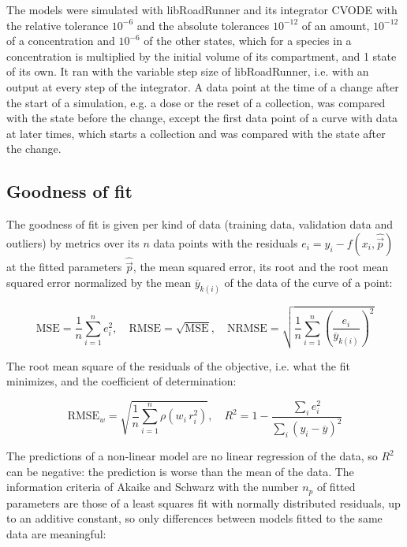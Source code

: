 The models were simulated with libRoadRunner \cite{Welsh2023} and its integrator CVODE \cite{Hindmarsh2005} with the relative tolerance $10^{-6}$ and the absolute tolerances $10^{-12}$ of an amount, $10^{-12}$ of a concentration and $10^{-6}$ of the other states, which for a species in a concentration is multiplied by the initial volume of its compartment, and 1 state of its own. It ran with the variable step size of libRoadRunner, i.e. with an output at every step of the integrator. A data point at the time of a change after the start of a simulation, e.g. a dose or the reset of a collection, was compared with the state before the change, except the first data point of a curve with data at later times, which starts a collection and was compared with the state after the change.

\subsection{Goodness of fit}

The goodness of fit is given per kind of data (training data, validation data and outliers) by metrics over its $n$ data points with the residuals $e_i = y_i - f(x_i, \hat{\vec{p}})$ at the fitted parameters $\hat{\vec{p}}$, the mean squared error, its root and the root mean squared error normalized by the mean $\overline{y}_{k(i)}$ of the data of the curve of a point:

\begin{equation}
\mathrm{MSE} = \frac{1}{n} \sum_{i=1}^{n} e_i^2, \quad \mathrm{RMSE} = \sqrt{\mathrm{MSE}}, \quad \mathrm{NRMSE} = \sqrt{\frac{1}{n} \sum_{i=1}^{n} \left(\frac{e_i}{\overline{y}_{k(i)}}\right)^2}
\end{equation}

The root mean square of the residuals of the objective, i.e. what the fit minimizes, and the coefficient of determination:

\begin{equation}
\mathrm{RMSE}_w = \sqrt{\frac{1}{n} \sum_{i=1}^{n} \rho\left(w_i\, r_i^2\right)}, \quad R^2 = 1 - \frac{\sum_{i} e_i^2}{\sum_{i} \left(y_i - \overline{y}\right)^2}
\end{equation}

The predictions of a non-linear model are no linear regression of the data, so $R^2$ can be negative: the prediction is worse than the mean of the data. The information criteria of Akaike \cite{Akaike1974} and Schwarz \cite{Schwarz1978} with the number $n_p$ of fitted parameters are those of a least squares fit with normally distributed residuals, up to an additive constant, so only differences between models fitted to the same data are meaningful:

